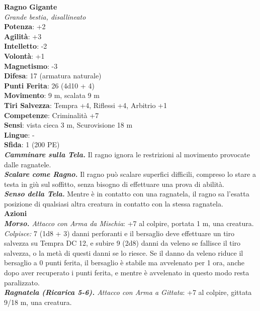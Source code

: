 \begin{multicols}{2}
\medskip\textbf{Ragno Gigante}\\
\emph{Grande bestia, disallineato}\\
\textbf{Potenza}: +2\\
\textbf{Agilità}: +3\\
\textbf{Intelletto}: -2\\
\textbf{Volontà}: +1\\
\textbf{Magnetismo}: -3\\
\textbf{Difesa}: 17 (armatura naturale)\\
\textbf{Punti Ferita}: 26 (4d10 + 4)\\
\textbf{Movimento}: 9 m, scalata 9 m\\
\textbf{Tiri Salvezza}:  Tempra +4, Riflessi +4, Arbitrio +1 \\
\textbf{Competenze}: Criminalità +7\\
\textbf{Sensi}: vista cieca 3 m, Scurovisione 18 m\\
\textbf{Lingue}: -\\
\textbf{Sfida}: 1 (200 PE)\smallskip\\
\emph{\textbf{Camminare sulla Tela.}} Il ragno ignora le restrizioni al movimento provocate dalle ragnatele.\\
\emph{\textbf{Scalare come Ragno.}} Il ragno può scalare superfici difficili, compreso lo stare a testa in giù sul soffitto, senza bisogno di effettuare una prova di abilità.\\
\emph{\textbf{Senso della Tela.}} Mentre è in contatto con una ragnatela, il ragno sa l'esatta posizione di qualsiasi altra creatura in contatto con la stessa ragnatela.\\
\smallskip\textbf{Azioni}\\
\emph{\textbf{Morso.} Attacco con Arma da Mischia}: +7 al colpire, portata 1 m, una creatura.\\
\emph{Colpisce:} 7 (1d8 + 3) danni perforanti e il bersaglio deve effettuare un tiro salvezza su Tempra DC  12, e subire 9 (2d8) danni da veleno se fallisce il tiro salvezza, o la metà di questi danni se lo riesce. Se il danno da veleno riduce il bersaglio a 0 punti ferita, il bersaglio è stabile ma avvelenato per 1 ora, anche dopo aver recuperato i punti ferita, e mentre è avvelenato in questo modo resta paralizzato.\\

\emph{\textbf{Ragnatela (Ricarica 5-6).} Attacco con Arma a Gittata}: +7 al colpire, gittata 9/18 m, una creatura.\\


\end{multicols}
